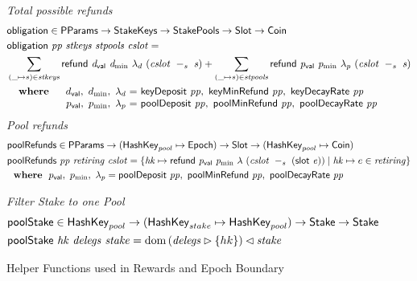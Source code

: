\begin{figure}[htb]
  \emph{Total possible refunds}
  \begin{align*}
      & \fun{obligation} \in \PParams \to \StakeKeys \to \StakePools \to \Slot \to \Coin \\
      & \obligation{pp}{stkeys}{stpools}{cslot} =\\
      & \sum\limits_{(\_ \mapsto s) \in \var{stkeys}}
        \refund{d_{\mathsf{val}}}{d_{\min}}{\lambda_d}{(\slotminus{cslot}{s})}
        + \sum\limits_{(\_ \mapsto s) \in \var{stpools}}
        \refund{p_{\mathsf{val}}}{p_{\min}}{\lambda_p}{(\slotminus{cslot}{s})} \\
      &
      \begin{array}{lr@{~=~}l}
        \where
          & \dval,~d_{\min},~\lambda_d
          & \fun{keyDeposit}~\var{pp},~\fun{keyMinRefund}~\var{pp},~\fun{keyDecayRate}~\var{pp}
          \\
          & p_{\mathsf{val}},~p_{\min},~\lambda_p
          & \fun{poolDeposit}~\var{pp},~\fun{poolMinRefund}~\var{pp},~\fun{poolDecayRate}~\var{pp}
      \end{array}\\
  \end{align*}
  \emph{Pool refunds}
  \begin{align*}
      & \mathsf{poolRefunds} \in \mathsf{PParams} \to (\mathsf{HashKey}_{pool} \mapsto \mathsf{Epoch}) \to \mathsf{Slot} \to
      (\mathsf{HashKey}_{pool} \mapsto \mathsf{Coin}) \\
      & \mathsf{poolRefunds}~ \mathit{pp}~ \mathit{retiring}~ \mathit{cslot} = \left\{
        \mathit{hk}\mapsto
          \mathsf{refund}~ \mathit{p_{\mathsf{val}}}~ \mathit{p_{\min}}~ {\lambda}~ {(\mathit{cslot}~-_{s}~\mathit{(\mathsf{slot}~e)})}
          \mid
          \mathit{hk}\mapsto e\in\mathit{retiring}
        \right\}\\
      & ~ ~ \mathbf{where}~ ~  p_{\mathsf{val}},~p_{\min},~\lambda_p =
          \mathsf{poolDeposit}~\mathit{pp},~\mathsf{poolMinRefund}~\mathit{pp},~\mathsf{poolDecayRate}~\mathit{pp} \\
  \end{align*}

  \emph{Filter Stake to one Pool}
  \begin{align*}
      & \mathsf{poolStake} \in \mathsf{HashKey}_{pool} \to (\mathsf{HashKey}_{stake} \mapsto \mathsf{HashKey}_{pool})
        \to \mathsf{Stake} \to \mathsf{Stake} \\
      & \mathsf{poolStake}~ \mathit{hk}~ \mathit{delegs}~ \mathit{stake} =
        \operatorname{dom}{(\mathit{delegs}\rhd\{hk\})\lhd\mathit{stake}}
  \end{align*}

  \caption{Helper Functions used in Rewards and Epoch Boundary}
  \label{fig:funcs:epoch-helper-rewards}
\end{figure}


